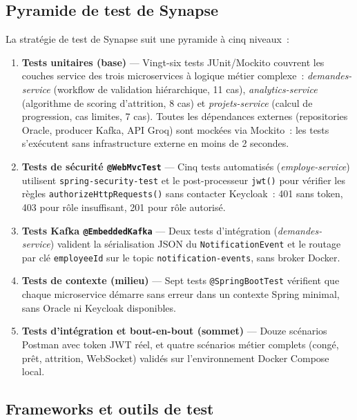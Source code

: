 \subsection{Pyramide de test de Synapse}

La stratégie de test de Synapse suit une pyramide à cinq niveaux~:

\begin{enumerate}[leftmargin=*,nosep]
  \item \textbf{Tests unitaires (base)} — Vingt-six tests JUnit/Mockito couvrent
        les couches service des trois microservices à logique métier complexe~:
        \textit{demandes-service} (workflow de validation hiérarchique, 11 cas),
        \textit{analytics-service} (algorithme de scoring d'attrition, 8 cas) et
        \textit{projets-service} (calcul de progression, cas limites, 7 cas).
        Toutes les dépendances externes (repositories Oracle, producer Kafka,
        API Groq) sont mockées via Mockito~: les tests s'exécutent sans
        infrastructure externe en moins de 2 secondes.
  \item \textbf{Tests de sécurité \texttt{@WebMvcTest}} — Cinq tests automatisés
        (\textit{employe-service}) utilisent \texttt{spring-security-test} et le
        post-processeur \texttt{jwt()} pour vérifier les règles
        \texttt{authorizeHttpRequests()} sans contacter Keycloak~: 401 sans token,
        403 pour rôle insuffisant, 201 pour rôle autorisé.
  \item \textbf{Tests Kafka \texttt{@EmbeddedKafka}} — Deux tests d'intégration
        (\textit{demandes-service}) valident la sérialisation JSON du
        \texttt{NotificationEvent} et le routage par clé \texttt{employeeId}
        sur le topic \texttt{notification-events}, sans broker Docker.
  \item \textbf{Tests de contexte (milieu)} — Sept tests \texttt{@SpringBootTest}
        vérifient que chaque microservice démarre sans erreur dans un contexte Spring
        minimal, sans Oracle ni Keycloak disponibles.
  \item \textbf{Tests d'intégration et bout-en-bout (sommet)} — Douze scénarios
        Postman avec token JWT réel, et quatre scénarios métier complets (congé,
        prêt, attrition, WebSocket) validés sur l'environnement Docker Compose local.
\end{enumerate}

\subsection{Frameworks et outils de test}

